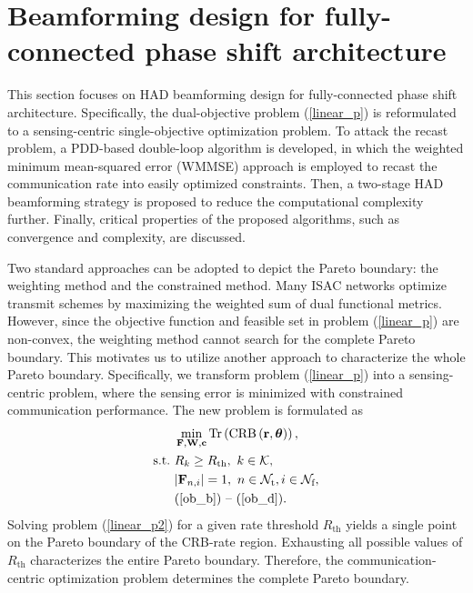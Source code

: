 \documentclass[10pt,journal,twocolumn]{IEEEtran}
\begin{document}
\section{Beamforming design for fully-connected phase shift architecture}\label{Section III}
This section focuses on HAD beamforming design for fully-connected phase shift architecture. Specifically, the dual-objective problem (\ref{linear_p}) is reformulated to a sensing-centric single-objective optimization problem. To attack the recast problem, a PDD-based double-loop algorithm is developed, in which the weighted minimum mean-squared error (WMMSE) approach is employed to recast the communication rate into easily optimized constraints. Then, a two-stage HAD beamforming strategy is proposed to reduce the computational complexity further. Finally,  critical properties of the proposed algorithms, such as convergence and complexity, are discussed. 

Two standard approaches can be adopted to depict the Pareto boundary: the weighting method and the constrained method. Many ISAC networks optimize transmit schemes by maximizing the weighted sum of dual functional metrics\cite{loli2022rate,9531484}. However, since the objective function and feasible set in problem (\ref{linear_p}) are non-convex, the weighting method cannot search for the complete Pareto boundary\cite{6565404}. This motivates us to utilize another approach to characterize the whole Pareto boundary. Specifically, we transform problem (\ref{linear_p}) into a sensing-centric problem, where the sensing error is minimized with constrained communication performance. The new problem is formulated as
\begin{subequations}\label{linear_p2}
	\begin{align}
&\min_{\mathbf{F},\mathbf{W},\mathbf{c} } \text{Tr}\left(\text{CRB}\left(\mathbf{r},\bm{\theta}\right)\right),\label{ob_a2}\\
	\text{s.t.}~
	&R_k\geq R_{\text{th}},~k\in\mathcal{K},\label{ob_b2}\\
   &|\mathbf{F}_{n,i}|=1,~ n\in\mathcal{N}_{\text{t}},i\in\mathcal{N}_{\text{f}},\label{ob_c2}\\
 &\mbox{(\ref{ob_b}) -- (\ref{ob_d})}.\label{ob_d2} 
	\end{align}
\end{subequations}
Solving problem (\ref{linear_p2}) for a given rate threshold $R_{\text{th}}$ yields a single point on the Pareto boundary of the CRB-rate region. Exhausting all possible values of $R_{\text{th}}$  characterizes the entire Pareto boundary. Therefore, the communication-centric optimization problem determines the complete Pareto boundary. 
\end{document}
